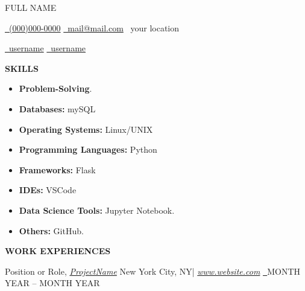 \documentclass[a4paper,10pt]{article}
\makeatletter
\newcommand{\Skills}
{\begin{flushleft}\begin{large}\textbf{SKILLS \hrulefill}\end{large}\end{flushleft}}
\newcommand{\Work}
{\begin{flushleft}\begin{large}\textbf{WORK EXPERIENCES \hrulefill}\end{large}\end{flushleft}}
\newcommand{\Name}{\begin{Huge}FULL NAME\end{Huge}}
\newcommand{\Phone}{\href{tel:(000)000-000}{\faPhone\ (000)000-0000}}
\newcommand{\Email}{\href{mailto:mail@mail.com}{\faEnvelope\ mail@mail.com}}
\newcommand{\GitHubURL}{\href{https://github.com/username/}{\faGithub \ username}}
\newcommand{\LinkedInURL}{\href{https://www.linkedin.com/in/username/}{\faLinkedin\ username}}
\newcommand{\Address}{\faMapPin\ your location}
\newcommand{\SoftSkills}
{Problem-Solving}
\newcommand{\Databases}
{mySQL}
\newcommand{\OS}
{Linux/UNIX}
\newcommand{\Languages}
{Python}
\newcommand{\Framework}
{Flask}
\newcommand{\IDE}
{VSCode}
\newcommand{\DataTool}
{Jupyter Notebook.}
\newcommand{\Other}
{GitHub.}
\makeatother
\begin{document}
\Name \hspace*{0.25 in} \Phone \hspace*{0.25 in} \Email \hspace*{0.25 in} \Address\

\vspace*{5pt}
\GitHubURL \hspace{0.25 in} \LinkedInURL\

\Skills
\begin{itemize}
\item \textbf{\SoftSkills}.

\item \textbf{Databases: }\Databases

\item \textbf{Operating Systems: }\OS

\item \textbf{Programming Languages: }\Languages

\item \textbf{Frameworks: }\Framework

\item \textbf{IDEs: }\IDE

\item \textbf{Data Science Tools: }\DataTool

\item \textbf{Others: }\Other

\end{itemize}\vspace*{5pt}
\Work
Position or Role,
\textit{\href{https://www.google.com}{ProjectName}}{
    \hspace{0.15 in} New York City, NY| \textit{\href{www.google.com}{www.website.com}}
    \textit{\href{https://website.com}{ \faInfoCircle
\ }}}{\hspace{0.05 in}MONTH YEAR – MONTH YEAR}\vspace*{5pt}
\end{document}
